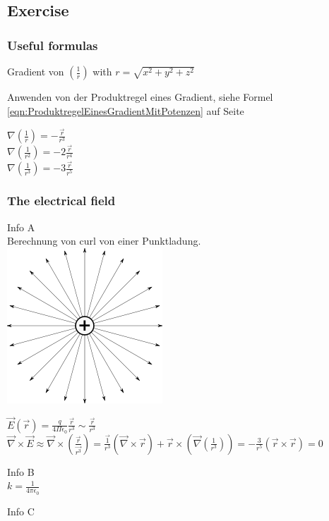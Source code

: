 \documentclass[a4paper, 10pt]{scrartcl}
\begin{document}
\subsection{Exercise}
\subsubsection{Useful formulas}

Gradient von $ (\frac{1}{r}) $  with $ r=\sqrt{x^2+y^2+z^2} $

Anwenden von der Produktregel eines Gradient, siehe Formel \ref{eqn:ProduktregelEinesGradientMitPotenzen} auf Seite \pageref{eqn:ProduktregelEinesGradientMitPotenzen}

$ \nabla(\frac{1}{r}) = -\frac{\vec{r}}{r^3}$
\\
$ \nabla(\frac{1}{r^2}) = -2\frac{\vec{r}}{r^4}$
\\
$ \nabla(\frac{1}{r^3}) = -3\frac{\vec{r}}{r^5}$

\subsubsection{The electrical field}

Info A\\
Berechnung von curl von einer Punktladung.\\ \includegraphics[scale=0.2]{images/punktladung.png}
\label{fig:Punktladung}

$ \vec{E}(\vec{r})=\frac{q}{4\Pi\epsilon_0}\frac{\vec{r}}{r^3}\sim \frac{\vec{r}}{r^3} $
\\
$ \vec{\nabla}\times\vec{E}\approx\vec{\nabla}\times(\frac{\vec{r}}{\vec{r^3}})=\frac{\vec{1}}{r^3}(\vec{\nabla}\times\vec{r})+\vec{r}\times(\vec{\nabla}(\frac{1}{r^3}))=-\frac{3}{r^5}(\vec{r}\times\vec{r})=0 $

Info B\\
$ k=\frac{1}{4\pi\epsilon_0} $

Info C\\
\end{document}
